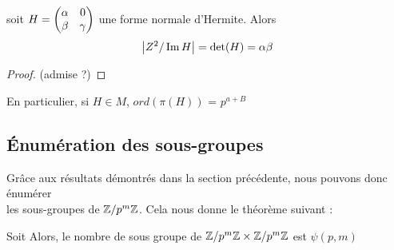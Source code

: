 \documentclass[12pt]{article}
\newcommand{\ZpmZ}{\Z/p^m\Z}
\newcommand{\ZZpm}{\ZpmZ \x \ZpmZ}
\begin{document}
\newpage
\begin{proposition}
	soit $H = \begin{pmatrix} \alpha & 0\\ \beta & \gamma \end{pmatrix}$ une forme normale d'Hermite. Alors
	$$\left\lvert Z^2/\operatorname{Im} H \right\rvert = \det(H) = \alpha\beta$$
\end{proposition}

\begin{proof}
	(admise ?)
\end{proof}

\begin{remark}
	En particulier, si $H \in M$, $ord(\pi(H))$ = $p^{a+B}$
\end{remark}
\subsection{Énumération des sous-groupes}
Grâce aux résultats démontrés dans la section précédente, nous pouvons donc énumérer\\
les sous-groupes de $\ZpmZ$. Cela nous donne le théorème suivant :
\begin{theorem}
	Soit
	Alors, le nombre de sous groupe de $\ZZpm$ est $\psi(p,m)$
\end{theorem}
\end{document}
